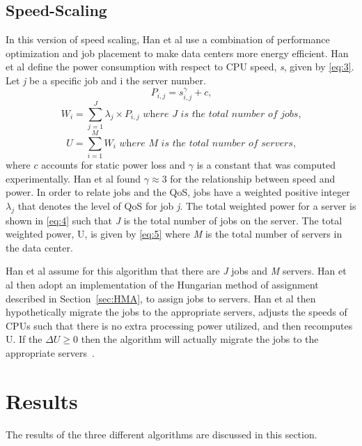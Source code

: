 \documentclass{sig-alternate}
\begin{document}
\subsection{Speed-Scaling}
\label{sec:Speed}
In this version of speed scaling, Han et al use a combination of performance optimization and job placement to make data centers more energy efficient. Han et al define the power consumption with respect to CPU speed, \emph{s}, given by \eqref{eq:3}. Let \emph{j} be a specific job and i the server number.
\begin{equation}
P_{i,j} = s_{i,j}^{\gamma}+ c \textit{,}\label{eq:3}
\end{equation}
\begin{equation}
W_{i} =\sum_{j=1}^J \lambda_{j} \times P_{i,j}\textit{~where J is the total number of jobs,}\label{eq:4}
\end{equation}
\begin{equation}
U =\sum_{i=1}^M W_{i} \textit{~where M is the total number of servers,}\label{eq:5}
\end{equation}
\noindent
where $c$ accounts for static power loss and $\gamma$ is a constant that was computed experimentally. Han et al found $\gamma \approx 3$ for the relationship between speed and power. In order to relate jobs and the QoS, jobs have a weighted positive integer $\lambda_j$ that denotes the level of QoS for job \emph{j}. The total weighted power for a server is shown in \eqref{eq:4} such that \emph{J} is the total number of jobs on the server. The total weighted power, U, is given by \eqref{eq:5} where \emph{M} is the total number of servers in the data center.

Han et al assume for this algorithm that there are \emph{J} jobs and \emph{M} servers. Han et al then adopt an implementation of the Hungarian method of assignment described in Section~\ref{sec:HMA}, to assign jobs to servers. Han et al then hypothetically migrate the jobs to the appropriate servers, adjusts the speeds of CPUs such that there is no extra processing power utilized, and then recomputes U. If the $\Delta U \geq 0$ then the algorithm will actually migrate the jobs to the appropriate servers~\cite{Han}. 

\section{Results} 
\label{sec:results}

The results of the three different algorithms are discussed in this section.
\end{document}

